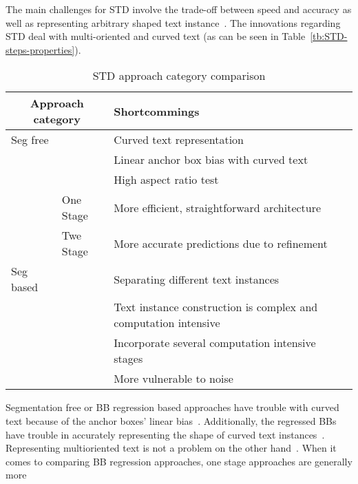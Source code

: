 The main challenges for \ac{STD} involve the trade-off between speed and accuracy as well as
representing arbitrary shaped text instance~\citep{wang_efficient_2019}.
The innovations regarding \ac{STD} deal with multi-oriented and curved text (as can be seen in
Table~\ref{tb:STD-steps-properties}).
\begin{table}[h]
    \centering\scriptsize
    \begin{tabular}{p{}p{}p{}}
        \multicolumn{2}{c}{\textbf{Approach category}} & \textbf{Shortcommings} \\
        \toprule
        Seg free & & Curved text representation~\citep{long_scene_2021,wang_shape_2019} \\
        & & Linear anchor box bias with curved text~\citep{wang_shape_2019,ferrari_textsnake_2018} \\
        & & High aspect ratio test~\citep{shi_detecting_2017,long_scene_2021} \\
        & One Stage & More efficient, straightforward architecture~\citep{lu_mimicdet_2020} \\
        & Twe Stage & More accurate predictions due to refinement~\citep{lu_mimicdet_2020} \\
        \midrule
        Seg based & & Separating different text instances~\citep{wang_shape_2019} \\
        & & Text instance construction is complex and computation
            intensive~\citep{xie_aggregation_2019,liao_real-time_2019,qiao_text_2021} \\
        & & Incorporate several computation intensive stages~\citep{dai_fused_2018} \\
        & & More vulnerable to noise~\citep{long_scene_2021} \\
        \bottomrule
    \end{tabular}
    \caption{STD approach category comparison\label{tb:STD-comparison}}
\end{table}
Segmentation free or \ac{BB} regression based approaches have trouble with curved text because of
the anchor boxes' linear bias~\citep{wang_shape_2019,ferrari_textsnake_2018}.
Additionally, the regressed \acp{BB} have trouble in accurately representing the shape of curved
text instances~\citep{long_scene_2021,wang_shape_2019}.
Representing multioriented text is not a problem on the other
hand~\citep{liao_textboxes_2018,jiang_r2cnn_2017}.
When it comes to comparing \ac{BB} regression approaches, one stage approaches are generally more
